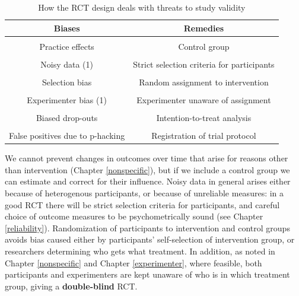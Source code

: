 \documentclass{krantz}
\begin{document}
\begin{table}

\caption{\label{tab:rctchart}How the RCT design deals with threats to study validity}
\centering
\begin{tabular}[t]{cc}
\toprule
Biases & Remedies\\
\midrule
\cellcolor{gray!6}{Spontaneous improvement} & \cellcolor{gray!6}{Control group}\\
Practice effects & Control group\\
\cellcolor{gray!6}{Regression to the mean} & \cellcolor{gray!6}{Control group}\\
Noisy data (1) & Strict selection criteria for participants\\
\cellcolor{gray!6}{Noisy data (2)} & \cellcolor{gray!6}{Outcomes with low measurement error}\\
\addlinespace
Selection bias & Random assignment to intervention\\
\cellcolor{gray!6}{Placebo effects} & \cellcolor{gray!6}{Participant unaware of assignment}\\
Experimenter bias (1) & Experimenter unaware of assignment\\
\cellcolor{gray!6}{Experimenter bias (2)} & \cellcolor{gray!6}{Strictly specified protocol}\\
Biased drop-outs & Intention-to-treat analysis\\
\addlinespace
\cellcolor{gray!6}{Low power} & \cellcolor{gray!6}{A priori power analysis}\\
False positives due to p-hacking & Registration of trial protocol\\
\bottomrule
\end{tabular}
\end{table}

We cannot prevent changes in outcomes over time that arise for reasons other than intervention (Chapter \ref{nonspecific}), but if we include a control group we can estimate and correct for their influence. Noisy data in general arises either because of heterogenous participants, or because of unreliable measures: in a good RCT there will be strict selection criteria for participants, and careful choice of outcome measures to be psychometrically sound (see Chapter \ref{reliability}). Randomization of participants to intervention and control groups avoids bias caused either by participants' self-selection of intervention group, or researchers determining who gets what treatment. In addition, as noted in Chapter \ref{nonspecific} and Chapter \ref{experimenter}, where feasible, both participants and experimenters are kept unaware of who is in which treatment group, giving a \textbf{double-blind} RCT.
\end{document}
